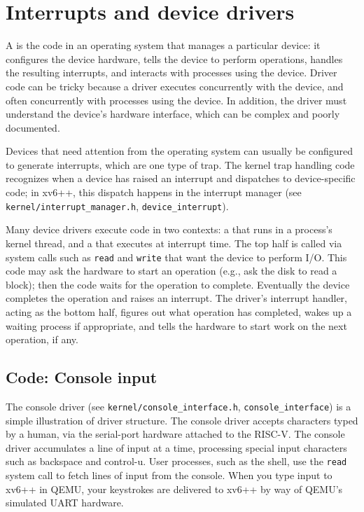 \chapter{Interrupts and device drivers}
\label{CH:INTERRUPT}

A
is the code in an operating system that manages a particular device:
it configures the device hardware,
tells the device to perform operations,
handles the resulting interrupts,
and interacts with processes using the device.
Driver code can be tricky
because a driver executes concurrently with the device,
and often concurrently with processes using the device.  In
addition, the driver must understand the device's hardware interface,
which can be complex and poorly documented.

Devices that need attention from the operating system can usually be
configured to generate interrupts, which are one type of trap.
The kernel trap handling code recognizes when a device
has raised an interrupt and dispatches to device-specific code; in xv6++,
this dispatch happens in the interrupt manager
(see \texttt{kernel/interrupt\_manager.h}, \texttt{device\_interrupt}).

Many device drivers execute code in two contexts: a  that runs in a process's kernel thread, and a  that executes at interrupt time. The top half
is called via system calls such as {\tt read} and {\tt write} that want
the device to perform I/O. This code may ask the hardware to start an
operation (e.g., ask the disk to read a block); then the code waits for
the operation to complete. Eventually the device completes the
operation and raises an interrupt. The driver's interrupt handler,
acting as the bottom half,
figures out what operation has completed, wakes up a waiting
process if appropriate, and tells the hardware to start work
on the next operation, if any.

\section{Code: Console input}

The console driver (see \texttt{kernel/console\_interface.h}, \texttt{console\_interface})
is a simple illustration of driver structure. The
console driver accepts characters typed by a human, via the 
serial-port hardware attached to the RISC-V. The console driver accumulates a
line of input at a time, processing special input characters such as
backspace and control-u. User processes, such as the shell, use
the {\tt read} system call to fetch lines of input from the console.
When you type input to xv6++ in QEMU, your keystrokes are delivered to
xv6++ by way of QEMU's simulated UART hardware.

